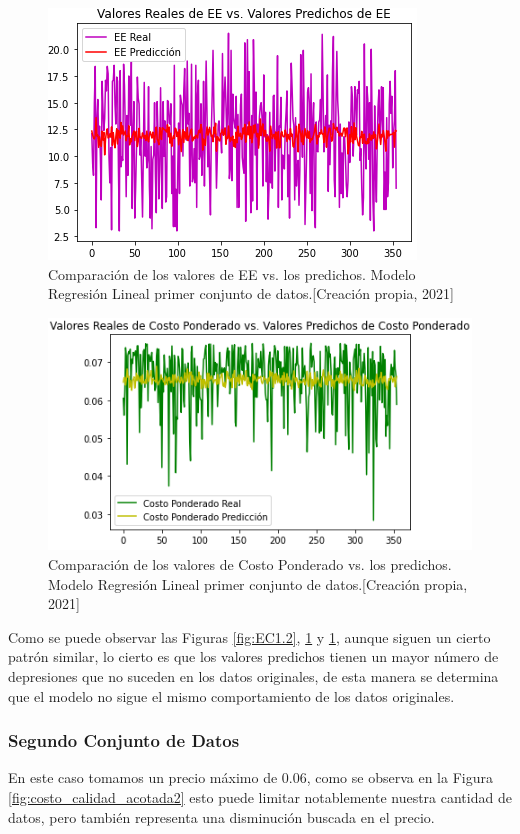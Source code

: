 \documentclass{article}
\begin{document}
\begin{figure}[!h]
    \centering
    \includegraphics[scale=.7]{F4/F4-im10.PNG}
    \caption{Comparación de los valores de EE vs. los predichos. Modelo Regresión Lineal primer conjunto de datos.[Creación propia, 2021]}
    \label{fig:EE1.2}
\end{figure}

\begin{figure}[!h]
    \centering
    \includegraphics[scale=.7]{F4/F4-im11.PNG}
    \caption{Comparación de los valores de Costo Ponderado vs. los predichos. Modelo Regresión Lineal primer conjunto de datos.[Creación propia, 2021]}
    \label{fig:CostoPonderado1.2}
\end{figure}
\pagebreak
Como se puede observar las Figuras \ref{fig:EC1.2}, \ref{fig:EE1.2} y \ref{fig:EE1.2}, aunque siguen un cierto patrón similar, lo cierto es que los valores predichos tienen un mayor número de depresiones que no suceden en los datos originales, de esta manera se determina que el modelo no sigue el mismo comportamiento de los datos originales.

\subsubsection{Segundo Conjunto de Datos} 
En este caso tomamos un precio máximo de 0.06, como se observa en la Figura \ref{fig:costo_calidad_acotada2} esto puede limitar notablemente nuestra cantidad de datos, pero también representa una disminución buscada en el precio.
\end{document}

